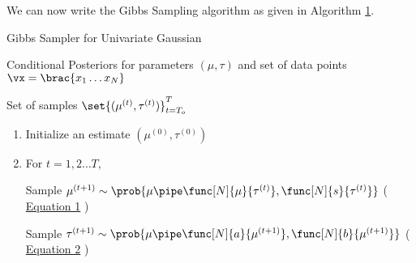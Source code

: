 \documentclass{article}
\begin{document}
\begin{question}
	We can now write the Gibbs Sampling algorithm as given in Algorithm \hyperlink{algo:1}{1}.

	\begin{algo}[0.9\textwidth]{Gibbs Sampler for Univariate Gaussian}

		 \quad Conditional Posteriors for parameters $(\mu, \tau)$ and set of data points $\vx = \brac{x_1 \dots x_N}$ \sbr

		 \quad Set of samples $\set{(\mu^{(t)}, \tau^{(t)})}_{t = T_o}^T$ \sbr


		\begin{enumerate}[label=\bt{\theenumi.}]
			\item Initialize an estimate $(\mu^{(0)}, \tau^{(0)})$
			\item For $t = 1, 2 \dots T$, \sbr

				\begin{addmargin}{1.2em}

					Sample $\mu^{(t + 1)} \sim \prob{\mu \pipe \func[N]{\mu}{\tau^{(t)}}, \func[N]{s}{\tau^{(t)}}}$ ( \hyperlink{eq:q1-1}{Equation 1} )

					Sample $\tau^{(t + 1)} \sim \prob{\mu \pipe \func[N]{a}{\mu^{(t + 1)}}, \func[N]{b}{\mu^{(t + 1)}}}$ ( \hyperlink{eq:q1-2}{Equation 2} )

				\end{addmargin}

		\end{enumerate}

	\end{algo}

\end{question}
\end{document}

